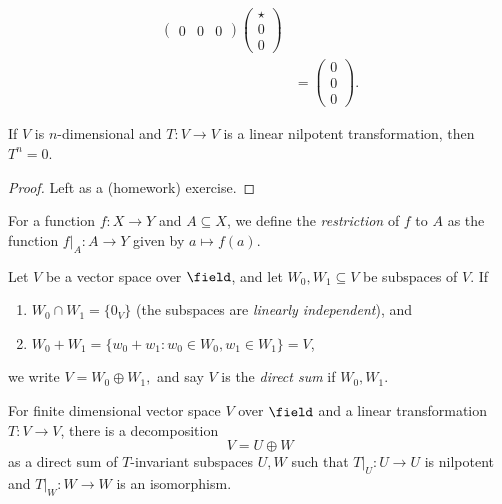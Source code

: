 \begin{example}
\begin{enumerate}
\begin{align*}
\begin{pmatrix}
                0 & 0 & 0
            \end{pmatrix} \begin{pmatrix}
                \star\\
                0\\
                0
            \end{pmatrix}\\
            &= \begin{pmatrix}
                0 \\
                0\\
                0
            \end{pmatrix}.
        \end{align*}
    \end{enumerate}
\end{example}
\begin{proposition}
    If $V$ is $n$-dimensional and $T :V \to V$ is a linear nilpotent transformation, then $T^n = 0$.
\end{proposition}
\begin{proof}
    Left as a (homework) exercise.
\end{proof}

\begin{definition}
    For a function $f: X \to Y$ and $A \subseteq X$, we define the \emph{restriction} of $f$ to $A$ as the function $f\vert_A : A \to Y$ given by $a \mapsto f(a)$.
\end{definition}

\begin{definition}
    Let $V$ be a vector space over $\field$, and let $W_0, W_1 \subseteq V$ be subspaces of $V$. If \begin{enumerate}
        \item $W_0 \cap W_1 = \{0_V\}$ (the subspaces are \emph{linearly independent}), and 
        \item $W_0 + W_1 = \{w_0 + w_1 : w_0 \in W_0, w_1 \in W_1\} = V$,
    \end{enumerate}
    we write \(
    V = W_0 \oplus W_1,    
    \)
    and say $V$ is the \emph{direct sum} if $W_0, W_1$.
\end{definition}

\begin{theorem}\label{thm:fittingstheorem}
    For finite dimensional vector space $V$ over $\field$ and a linear transformation $T: V \to V$, there is a decomposition \[
    V = U \oplus W    
    \]
    as a direct sum of $T$-invariant subspaces $U, W$ such that $T\vert_U : U \to U$ is nilpotent and $T\vert_W : W \to W$ is an isomorphism.
\end{theorem}

